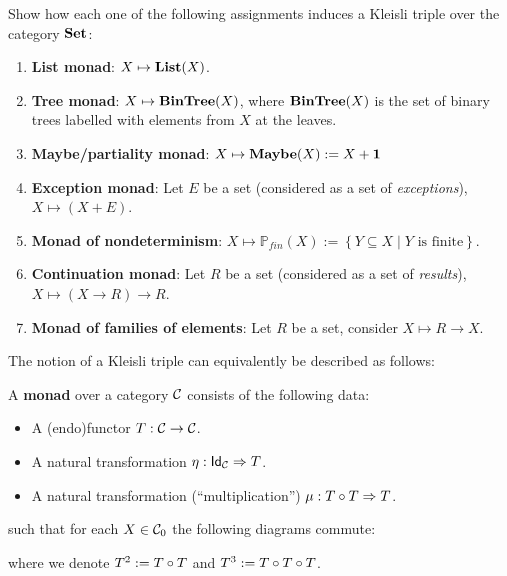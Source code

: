 \begin{exer}\label{exer:examples-kleisli-triples}
  Show how each one of the following assignments induces a Kleisli triple over the category $\SET$: 
\begin{enumerate}
\item \textbf{List monad}: $X\mapsto \List(X)$.
\item \textbf{Tree monad}: $X\mapsto \BinTree(X)$, where $\BinTree(X)$ is the set of binary trees labelled with elements from $X$ at the leaves.
\item \textbf{Maybe/partiality monad}: $X\mapsto \Maybe(X) := X + \mathbf{1}$ 
\item \textbf{Exception monad}: Let $E$ be a set (considered as a set of \textit{exceptions}), $X\mapsto (X + E)$.
\item \textbf{Monad of nondeterminism}: $X\mapsto \mathbb{P}_{fin}(X) := \left\{Y\subseteq X \mid  Y \text{ is finite}\right\}$.
\item \textbf{Continuation monad}: Let $R$ be a set (considered as a set of \textit{results}), $X\mapsto (X \to R) \to R$.
\item \textbf{Monad of families of elements}: Let $R$ be a set, consider $X \mapsto R \to X$.
\end{enumerate}
\end{exer}



The notion of a Kleisli triple can equivalently be described  as follows:
\begin{dfn}\label{def:monad}
A \textbf{monad} over a category $\CC$ consists of the following data:
\begin{itemize}
\item A (endo)functor $T:\CC\to\CC$.
\item A natural transformation $\NatTrans{\eta}{\Id[\CC]}{T}$.
\item A natural transformation (``multiplication'') $\NatTrans{\mu}{\co{T}{T}}{T}$.
\end{itemize}
such that for each $X\in\Ob{\CC}$ the following diagrams commute:
\begin{center}
\quad
{}

\end{center}
where we denote $T^2 := \co{T}{T}$ and $T^3 := \co{T}{\co{T}{T}}$.
\end{dfn}

